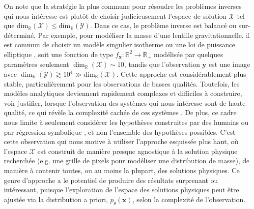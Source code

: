 On note que la stratégie la plus commune pour résoudre les problèmes inverses qui nous intéresse est plutôt de 
choisir judicieusement l'espace de solution $\mathcal{X}$ tel que $\mathrm{dim}_{\mathbb{R}}(\mathcal{X}) \leq \mathrm{dim}_{\mathbb{R}}(\mathcal{Y})$. 
Dans ce cas, le problème inverse est balancé ou sur-déterminé. 
Par exemple, pour modéliser la masse d'une lentille gravitationnelle, il est commun  
de choisir un modèle singulier isotherme ou une loi de puissance elliptique \citep[e.g.][]{Koopmans2006,Barnabe2009,Auger2010}, 
soit une fonction de type $f_{\mathbf{x}}: \mathbb{R}^{2} \rightarrow \mathbb{R}_+$ 
modélisée par quelques paramètres seulement 
$\dim_{\mathbb{R}}(\mathcal{X}) \sim 10$, tandis que 
l'observation $\mathbf{y}$ est une image avec $\dim_{\mathbb{R}}(\mathcal{Y}) \gtrsim 10^{4} \gg \mathrm{dim}_{\mathbb{R}}(\mathcal{X})$. 
Cette approche est considérablement plus stable, particulièrement pour les observations de basses qualités. Toutefois, 
les modèles analytiques deviennent rapidement complexes et difficiles à construire, voir justifier, lorsque l'observation des systèmes qui nous intéresse
sont de haute qualité, ce qui révèle la complexité cachée de ces systèmes \citep[e.g.][]{Schuldt2019}. 
De plus, ce cadre nous limite à seulement considérer les hypothèses construites par des humains 
ou par régression symbolique \citep[e.g.][]{Lemos2022}, et non l'ensemble des hypothèses possibles.
C'est cette observation qui nous motive à utiliser l'approche esquissée plus haut, 
où l'espace $\mathcal{X}$ est construit de manière presque agnostique à la solution 
physique recherchée (e.g. une grille de pixels pour modéliser une distribution de masse), 
de manière à contenir toutes, ou au moins la plupart, des solutions physiques. Ce genre d'approche a 
le potentiel de produire des résultats surprenant ou intéressant, puisque l'exploration de l'espace des solutions physiques 
peut être ajustée via la distribution a priori, $p_\theta(\mathbf{x})$, selon la complexité de l'observation.

